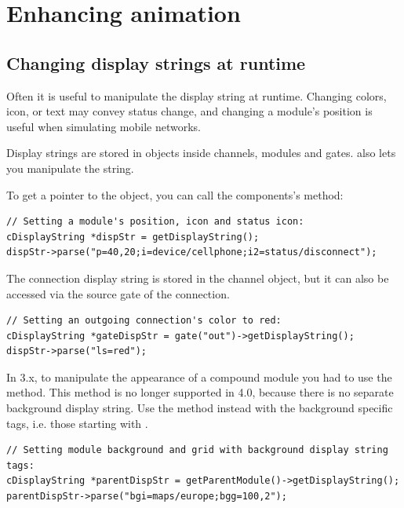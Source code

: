 \section{Enhancing animation}

\subsection{Changing display strings at runtime}

Often it is useful to manipulate the display string at runtime.
Changing colors, icon, or text may convey status change, and
changing a module's position is useful when simulating mobile
networks.

Display strings are stored in  objects inside
channels, modules and gates.  also lets you
manipulate the string.

To get a pointer to the  object, you can call
the components's  method:

\begin{verbatim}
// Setting a module's position, icon and status icon:
cDisplayString *dispStr = getDisplayString();
dispStr->parse("p=40,20;i=device/cellphone;i2=status/disconnect");
\end{verbatim}

\begin{note}
The connection display string is stored in the channel object, but it
can also be accessed via the source gate of the connection.
\end{note}

\begin{verbatim}
// Setting an outgoing connection's color to red:
cDisplayString *gateDispStr = gate("out")->getDisplayString();
dispStr->parse("ls=red");
\end{verbatim}

\begin{note}
In {\opp} 3.x, to manipulate the appearance of a compound module you had to use
the  method. This method is no longer 
supported in {\opp} 4.0, because there is no separate background display string. 
Use the  method instead with the background
specific tags, i.e. those starting with .
\end{note}

\begin{verbatim}
// Setting module background and grid with background display string tags:
cDisplayString *parentDispStr = getParentModule()->getDisplayString();
parentDispStr->parse("bgi=maps/europe;bgg=100,2");
\end{verbatim}

